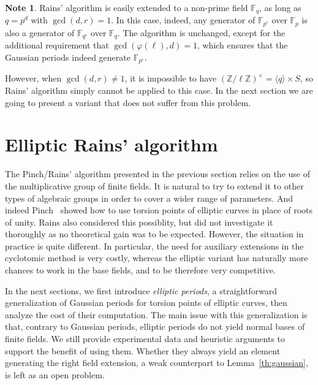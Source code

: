 \documentclass[12pt]{article}
\theoremstyle{plain}
\theoremstyle{definition}
\newtheorem{note}[theorem]{Note}
\def\Z{\ensuremath{\mathbb{Z}}}
\def\F{\ensuremath{\mathbb{F}}}
\def\euler{\ensuremath{\varphi}}
\newcounter{algorithm}
\begin{document}
\begin{note}
  \label{note:rains-non-prime}
  Rains' algorithm is easily extended to a non-prime field $\F_q$, as
  long as $q=p^d$ with $\gcd(d,r)=1$. In this case, indeed, any
  generator of $\F_{p^r}$ over $\F_p$ is also a generator of
  $\F_{q^r}$ over $\F_q$. The algorithm is unchanged, except for the
  additional requirement that $\gcd(\euler(\ell),d)=1$, which ensures
  that the Gaussian periods indeed generate $\F_{p^r}$.

  However, when $\gcd(d,r)\ne 1$, it is impossible to have
  $(\Z/\ell\Z)^\times=\langle q\rangle\times S$, so Rains' algorithm
  simply cannot be applied to this case. In the next section we are
  going to present a variant that does not suffer from this problem.
\end{note}



\section{Elliptic Rains' algorithm}
\label{sec:rains-elliptic}

The Pinch/Rains' algorithm presented in the previous section relies on the use
of the multiplicative group of finite fields.
It is natural to try to extend it to other types of algebraic groups in
order to cover a wider range of parameters.
And indeed Pinch~\cite{Pinch} showed how to use torsion points of elliptic
curves in place of roots of unity.
Rains also considered this possiblity, but did not investigate it thoroughly
as no theoretical gain was to be expected.
However, the situation in practice is quite different.
In particular, the need for auxiliary extensions in the cyclotomic method
is very costly, whereas the elliptic variant has naturally more chances
to work in the base fields, and to be therefore very competitive.

In the next sections, we first introduce \emph{elliptic periods}, a
straightforward generalization of Gaussian periods for torsion points
of elliptic curves,
then analyze the cost of their computation.
The main issue with this generalization is that, contrary to Gaussian periods,
elliptic periods do not yield normal bases of finite fields.
We still provide experimental data and heuristic arguments
to support the benefit of using them.
Whether they always yield an element generating the right field extension,
a weak counterpart to Lemma~\ref{th:gaussian}, is left as an open problem.
\end{document}
